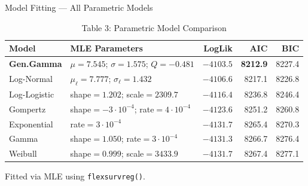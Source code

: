 \documentclass[aspectratio=169, 11pt]{beamer}
\begin{document}
\begin{frame}{Model Fitting --- All Parametric Models}

  \vspace{2pt}
  \begin{table}
    \caption{Table 3: Parametric Model Comparison}
    \centering\small
    \begin{tabular}{@{}l@{\;}l@{\;}r@{\;}r@{\;}r@{}}
      \toprule
      \textbf{Model} & \textbf{MLE Parameters}
        & \textbf{LogLik} & \textbf{AIC} & \textbf{BIC}\\
      \midrule

      \textbf{Gen.Gamma}
        & $\mu{=}7.545$; $\sigma{=}1.575$; $Q{=}-0.481$
        & $-4103.5$ & \textbf{8212.9} & 8227.4\\
        
      Log-Normal
        & $\mu_{\ell}{=}7.777$; $\sigma_{\ell}{=}1.432$
        & $-4106.6$ & 8217.1 & 8226.8\\
        
      Log-Logistic
        & shape$=1.202$; scale$=2309.7$
        & $-4116.4$ & 8236.8 & 8246.4\\
        
      Gompertz
        & shape$=-3{\cdot}10^{-4}$; rate$=4{\cdot}10^{-4}$
        & $-4123.6$ & 8251.2 & 8260.8\\
        
      Exponential
        & rate$=3{\cdot}10^{-4}$
        & $-4131.7$ & 8265.4 & 8270.3\\
        
      Gamma
        & shape$=1.050$; rate$=3{\cdot}10^{-4}$
        & $-4131.3$ & 8266.7 & 8276.4\\
        
      Weibull
        & shape$=0.999$; scale$=3433.9$
        & $-4131.7$ & 8267.4 & 8277.1\\
      \bottomrule
    \end{tabular}
  \end{table}

  \vspace{2pt}
  \footnotesize
  Fitted via MLE using \texttt{flexsurvreg()}.

\end{frame}
\end{document}
